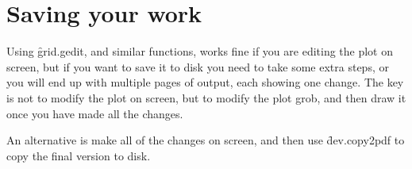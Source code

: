% 
% 
% 
% 


\section{Saving your work} 
\label{sec:grid-save}

Using \f{grid.gedit}, and similar functions, works fine if you are editing the plot on screen, but if you want to save it to disk you need to take some extra steps, or you will end up with multiple pages of output, each showing one change.  The key is not to modify the plot on screen, but to modify the plot grob, and then draw it once you have made all the changes. 

% 
% 


An alternative is make all of the changes on screen, and then use \f{dev.copy2pdf} to copy the final version to disk.


